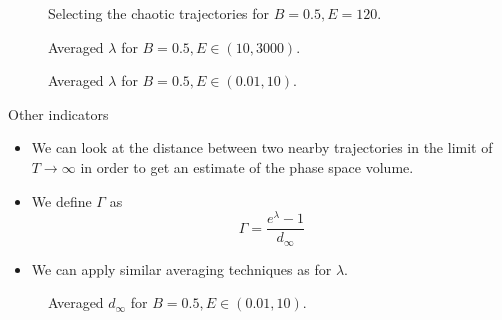 \documentclass{beamer}
\begin{document}

\begin{frame}
	\begin{figure}
		
		\caption{Selecting the chaotic trajectories for \(B=0.5, E=120\).}
	\end{figure}
\end{frame}


\begin{frame}
	\begin{figure}
		
		\caption{Averaged \(\lambda\) for \(B=0.5, E \in (10, 3000)\).}
	\end{figure}
\end{frame}


\begin{frame}
	\begin{figure}
		
		\caption{Averaged \(\lambda\) for \(B=0.5, E \in (0.01, 10)\).}
	\end{figure}
\end{frame}


\begin{frame}{Other indicators}
	\begin{itemize}
		\item We can look at the distance between two nearby
		trajectories in the limit of \(T \to \infty\) in order to
		get an estimate of the phase space volume.
		\item We define \(\Gamma\) as
		\[
		\Gamma = \frac{e^\lambda - 1}{d_\infty}
		\]
		\item We can apply similar averaging techniques as for \(\lambda\).

	\end{itemize}
\end{frame}


\begin{frame}
	\begin{figure}
		
		\caption{Averaged \(d_\infty\) for \(B=0.5, E \in (0.01, 10)\).}
	\end{figure}
\end{frame}
\end{document}
